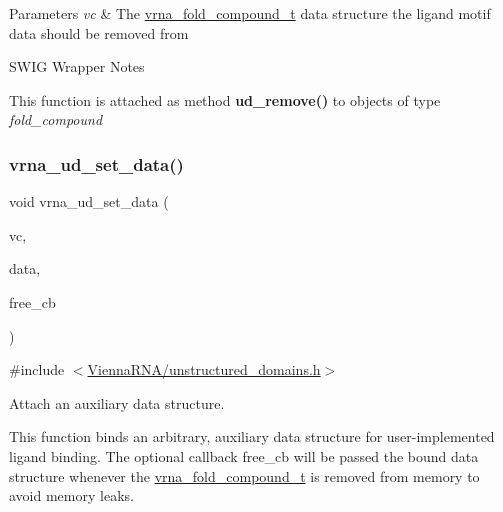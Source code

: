 \begin{DoxyParams}{Parameters}
{\em vc} & The \hyperlink{group__fold__compound_ga1b0cef17fd40466cef5968eaeeff6166}{vrna\+\_\+fold\+\_\+compound\+\_\+t} data structure the ligand motif data should be removed from\\
\hline
\end{DoxyParams}
\begin{DoxyRefDesc}{S\+W\+I\+G Wrapper Notes}
\item[\hyperlink{wrappers__wrappers000075}{S\+W\+I\+G Wrapper Notes}]This function is attached as method {\bfseries ud\+\_\+remove()} to objects of type {\itshape fold\+\_\+compound} \end{DoxyRefDesc}
\mbox{\label{group__domains__up_gac1f18c312b91d80089534a87d956e58b}} 
\subsubsection{\texorpdfstring{vrna\+\_\+ud\+\_\+set\+\_\+data()}{vrna\_ud\_set\_data()}}
{\footnotesize\ttfamily void vrna\+\_\+ud\+\_\+set\+\_\+data (\begin{DoxyParamCaption}\item[{\hyperlink{group__fold__compound_ga1b0cef17fd40466cef5968eaeeff6166}{vrna\+\_\+fold\+\_\+compound\+\_\+t} $\ast$}]{vc,  }\item[{void $\ast$}]{data,  }\item[{\hyperlink{group__fold__compound_ga7806651f51b195013839a218b3bbd5a3}{vrna\+\_\+callback\+\_\+free\+\_\+auxdata} $\ast$}]{free\+\_\+cb }\end{DoxyParamCaption})}



{\ttfamily \#include $<$\hyperlink{unstructured__domains_8h}{Vienna\+R\+N\+A/unstructured\+\_\+domains.\+h}$>$}



Attach an auxiliary data structure. 

This function binds an arbitrary, auxiliary data structure for user-\/implemented ligand binding. The optional callback {\ttfamily free\+\_\+cb} will be passed the bound data structure whenever the \hyperlink{group__fold__compound_ga1b0cef17fd40466cef5968eaeeff6166}{vrna\+\_\+fold\+\_\+compound\+\_\+t} is removed from memory to avoid memory leaks.

